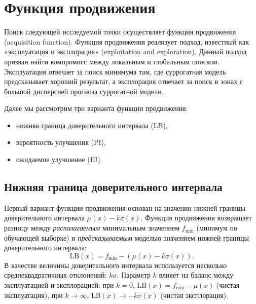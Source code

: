 \documentclass[11pt,a4paper]{article}
\providecommand{\tightlist}{%
      \setlength{\itemsep}{0pt}\setlength{\parskip}{0pt}}
\begin{document}
    \hypertarget{ux444ux443ux43dux43aux446ux438ux44f-ux43fux440ux43eux434ux432ux438ux436ux435ux43dux438ux44f}{%
\section{Функция
продвижения}\label{ux444ux443ux43dux43aux446ux438ux44f-ux43fux440ux43eux434ux432ux438ux436ux435ux43dux438ux44f}}

    Поиск следующей исследуемой точки осуществляет функция продвижения
(acquisition function). Функция продвижения реализует подход, известный
как «эксплуатация и эксплорация» (exploitation and exploration). Данный
подход призван найти компромисс между локальным и глобальным поиском.
Эксплуатация отвечает за поиск минимума там, где суррогатная модель
предсказывает хороший результат, а эксплорация отвечает за поиск в зонах
с большой дисперсией прогноза суррогатной модели.

    Далее мы рассмотрим три варианта функции продвижения:

\begin{itemize}
\tightlist
\item
  нижняя граница доверительного интервала (LB),
\item
  вероятность улучшения (PI),
\item
  ожидаемое улучшение (EI).
\end{itemize}

    \hypertarget{ux43dux438ux436ux43dux44fux44f-ux433ux440ux430ux43dux438ux446ux430-ux434ux43eux432ux435ux440ux438ux442ux435ux43bux44cux43dux43eux433ux43e-ux438ux43dux442ux435ux440ux432ux430ux43bux430}{%
\subsection{Нижняя граница доверительного
интервала}\label{ux43dux438ux436ux43dux44fux44f-ux433ux440ux430ux43dux438ux446ux430-ux434ux43eux432ux435ux440ux438ux442ux435ux43bux44cux43dux43eux433ux43e-ux438ux43dux442ux435ux440ux432ux430ux43bux430}}

Первый вариант функции продвижения основан на значении нижней границы
доверительного интервала \(\mu(x) - k \sigma(x)\). Функция продвижения
возвращает разницу между \emph{располагаемым} минимальным значением
\(f_\mathrm{min}\) (минимум по обучающей выборке) и
\emph{предсказываемым} моделью значением нижней границы доверительного
интервала:
\[
  \mathrm{LB}(x) = f_\mathrm{min} - \left(\mu(x) - k \sigma(x) \right).
\]
В качестве величины доверительного интервала используется несколько
среднеквадратичных отклонений: \(k\sigma\). Параметр \(k\) влияет на
баланс между эксплуатацией и эксплорацией: при \(k = 0\),
\(\mathrm{LB}(x) = f_\mathrm{min} - \mu(x)\) (чистая эксплуатация), при
\(k \rightarrow \infty\), \(\mathrm{LB}(x) \rightarrow -k \sigma(x)\)
(чистая эксплорация).
\end{document}
